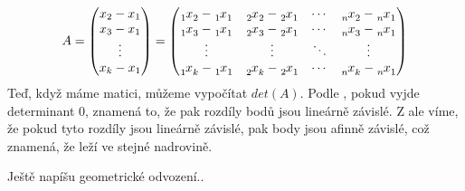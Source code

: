 
\begingroup
\renewcommand*{\arraystretch}{1.25}
\delimitershortfall=0pt
\begin{equation*}
  A =
  \begin{pmatrix}
    x_2-x_1 \\
    x_3-x_1 \\
    \vdots  \\
    x_k-x_1
  \end{pmatrix}
  =
  \begin{pmatrix}
    \x{1}{2} - \x{1}{1} & \x{2}{2} - \x{2}{1} & \cdots & \x{n}{2} - \x{n}{1} \\
    \x{1}{3} - \x{1}{1} & \x{2}{3} - \x{2}{1} & \cdots & \x{n}{3} - \x{n}{1} \\
    \vdots        & \vdots        & \ddots & \vdots        \\
    \x{1}{k} - \x{1}{1} & \x{2}{k} - \x{2}{1} & \cdots & \x{n}{k} - \x{n}{1} \\
  \end{pmatrix}
\end{equation*}
\endgroup
Teď, když máme matici, můžeme vypočítat $det(A)$. Podle , pokud vyjde determinant 0, znamená to, že pak rozdíly bodů jsou lineárně závislé. Z  ale víme, že pokud tyto rozdíly jsou lineárně závislé, pak body jsou afinně závislé, což znamená, že leží ve stejné nadrovině.  

Ještě napíšu geometrické odvození..


